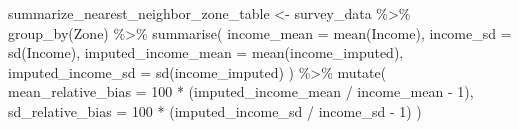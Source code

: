 \documentclass[
  spanish,
  11pt,
  letterpaper,
  oneside,
  open=any]{scrbook}
\newenvironment{Shaded}{\begin{snugshade}}{\end{snugshade}}
\newcommand{\AttributeTok}[1]{\textcolor[rgb]{0.40,0.45,0.13}{#1}}
\newcommand{\DecValTok}[1]{\textcolor[rgb]{0.68,0.00,0.00}{#1}}
\newcommand{\FunctionTok}[1]{\textcolor[rgb]{0.28,0.35,0.67}{#1}}
\newcommand{\NormalTok}[1]{\textcolor[rgb]{0.00,0.23,0.31}{#1}}
\newcommand{\OtherTok}[1]{\textcolor[rgb]{0.00,0.23,0.31}{#1}}
\newcommand{\SpecialCharTok}[1]{\textcolor[rgb]{0.37,0.37,0.37}{#1}}
\begin{document}
\begin{Shaded}
\begin{Highlighting}[]
\NormalTok{summarize\_nearest\_neighbor\_zone\_table }\OtherTok{\textless{}{-}}\NormalTok{ survey\_data }\SpecialCharTok{\%\textgreater{}\%}
  \FunctionTok{group\_by}\NormalTok{(Zone) }\SpecialCharTok{\%\textgreater{}\%}
  \FunctionTok{summarise}\NormalTok{(}
    \AttributeTok{income\_mean =} \FunctionTok{mean}\NormalTok{(Income),}
    \AttributeTok{income\_sd =} \FunctionTok{sd}\NormalTok{(Income),}
    \AttributeTok{imputed\_income\_mean =} \FunctionTok{mean}\NormalTok{(income\_imputed),}
    \AttributeTok{imputed\_income\_sd =} \FunctionTok{sd}\NormalTok{(income\_imputed)}
\NormalTok{  ) }\SpecialCharTok{\%\textgreater{}\%}
  \FunctionTok{mutate}\NormalTok{(}
    \AttributeTok{mean\_relative\_bias =} \DecValTok{100} \SpecialCharTok{*}\NormalTok{ (imputed\_income\_mean }\SpecialCharTok{/}\NormalTok{ income\_mean }\SpecialCharTok{{-}} \DecValTok{1}\NormalTok{),}
    \AttributeTok{sd\_relative\_bias =} \DecValTok{100} \SpecialCharTok{*}\NormalTok{ (imputed\_income\_sd }\SpecialCharTok{/}\NormalTok{ income\_sd }\SpecialCharTok{{-}} \DecValTok{1}\NormalTok{)}
\NormalTok{  )}
\end{Highlighting}
\end{Shaded}
\end{document}
